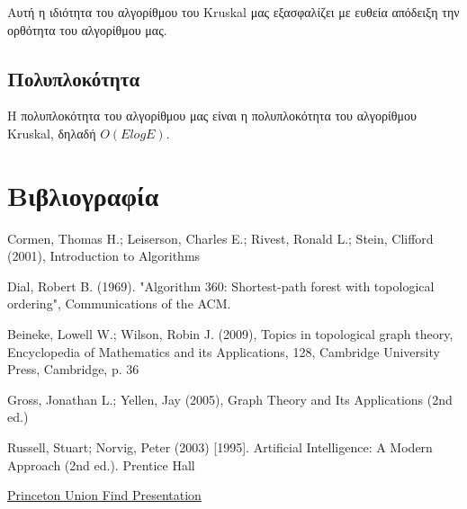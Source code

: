 \documentclass[a4paper,oneside, 11pt]{article}
\begin{document}
Αυτή η ιδιότητα του αλγορίθμου του Kruskal μας εξασφαλίζει με ευθεία απόδειξη την ορθότητα του αλγορίθμου μας.


\subsection{Πολυπλοκότητα}

Η πολυπλοκότητα του αλγορίθμου μας είναι η πολυπλοκότητα του αλγορίθμου Kruskal, δηλαδή $O(ElogE)$.


\section{Βιβλιογραφία}
\noindent [1] Cormen, Thomas H.; Leiserson, Charles E.; Rivest, Ronald L.; Stein, Clifford (2001), Introduction to Algorithms \par 
\noindent [2] Dial, Robert B. (1969). "Algorithm 360: Shortest-path forest with topological ordering", Communications of the ACM. \par 
\noindent [3]  Beineke, Lowell W.; Wilson, Robin J. (2009), Topics in topological graph theory, Encyclopedia of Mathematics and its Applications, 128, Cambridge University Press, Cambridge, p. 36 \par 
\noindent [4] Gross, Jonathan L.; Yellen, Jay (2005), Graph Theory and Its Applications (2nd ed.) \par 
\noindent [5] Russell, Stuart; Norvig, Peter (2003) [1995]. Artificial Intelligence: A Modern Approach (2nd ed.). Prentice Hall  \par 
\noindent [6] \href{https://www.cs.princeton.edu/~rs/AlgsDS07/01UnionFind.pdf}{Princeton Union Find Presentation}
\end{document}
